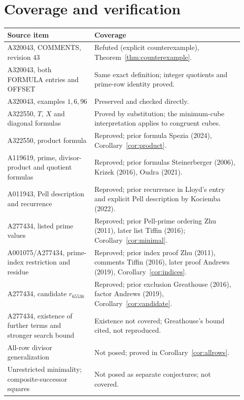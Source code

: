 \documentclass[11pt]{article}
\begin{document}
\section{Coverage and verification}
\begin{center}
\small
\begin{tabular}{@{}p{0.35\linewidth}p{0.60\linewidth}@{}}
\toprule
Source item & Coverage\\
\midrule
A320043, COMMENTS, revision 43 & Refuted (explicit counterexample),
Theorem~\ref{thm:counterexample}.\\
A320043, both FORMULA entries and OFFSET & Same exact definition;
integer quotients and prime-row identity proved.\\
A320043, examples $1,6,96$ & Preserved and checked directly.\\
A322550, $T$, $X$ and diagonal formulas & Proved by substitution;
the minimum-cube interpretation applies to congruent cubes.\\
A322550, product formula & Reproved; prior formula Spezia (2024),
Corollary~\ref{cor:product}.\\
A119619, prime, divisor-product and quotient formulas & Reproved; prior
formulas Steinerberger (2006), Krizek (2016), Oudra (2021).\\
A011943, Pell description and recurrence & Reproved; prior recurrence
in Lloyd's entry and explicit Pell description by Kociemba (2022).\\
A277434, listed prime values & Reproved; prior Pell-prime ordering
Zhu (2011), later list Tiffin (2016); Corollary~\ref{cor:minimal}.\\
A001075/A277434, prime-index restriction and residue & Reproved;
prior index proof Zhu (2011), comments Tiffin (2016), later proof
Andrews (2019), Corollary~\ref{cor:indices}.\\
A277434, candidate $r_{65536}$ & Reproved; prior exclusion
Greathouse (2016), factor Andrews (2019), Corollary~\ref{cor:candidate}.\\
A277434, existence of further terms and stronger search bound &
Existence not covered; Greathouse's bound cited, not reproduced.\\
All-row divisor generalization & Not posed; proved in
Corollary~\ref{cor:allrows}.\\
Unrestricted minimality; composite-successor squares &
Not posed as separate conjectures; not covered.\\
\bottomrule
\end{tabular}
\end{center}
\end{document}

